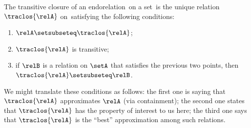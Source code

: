 \begin{remark}
The transitive closure of an endorelation~\relA on a set~\setA is the unique relation $\traclos{\relA}$ on~\setA satisfying the following conditions:
    \begin{enumerate}
        \item $\relA \setsubseteq \traclos{\relA}$;
        \item $\traclos{\relA}$ is transitive;
        \item if $\relB$ is a relation on $\setA$ that satisfies the previous two points, then $\traclos{\relA} \setsubseteq \relB$.
    \end{enumerate}
We might translate these conditions as follows: the first one is saying that $\traclos{\relA}$ approximates $\relA$ (via containment); the second one states that $\traclos{\relA}$ has the property of interest to us here; the third one says that $\traclos{\relA}$ is the ``best'' approximation among such relations. 
\end{remark}


